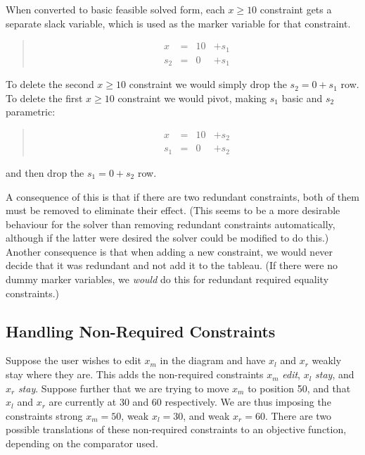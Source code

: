 \documentclass{article}
\newcommand{\strength}{\sf}
\begin{document}
When converted to basic feasible solved form, each $x \geq 10$ constraint
gets a separate slack variable, which is used as the marker variable for
that constraint.


\begin{quote}\vspace*{-1ex}
$$
\begin{array}{rlrrr} 
x & = & 10 & + s_1   \\ \hline
s_2 & = & 0 & + s_1 
\end{array}
$$
\end{quote}\vspace{-0.9ex}

To delete the second $x \geq 10$ constraint we would simply drop
the $s_2 = 0 + s_1$ row.  To delete the first  $x \geq 10$ constraint we
would pivot, making $s_1$ basic and $s_2$ parametric:

\begin{quote}\vspace*{-1ex}
$$
\begin{array}{rlrrr}
x & = & 10 & + s_2   \\ \hline
s_1 & = & 0 & + s_2
\end{array}
$$
\end{quote}\vspace{-0.9ex}

and then drop the  $s_1 = 0 + s_2$ row.

A consequence of this is that if there are two redundant constraints, both
of them must be removed to eliminate their effect.  (This seems to be a
more desirable behaviour for the solver than removing redundant constraints
automatically, although if the latter were desired the solver could be
modified to do this.)  Another consequence is that when adding a new
constraint, we would never decide that it was redundant and not add it to
the tableau.  (If there were no dummy marker variables, we {\em would} do this
for redundant required equality constraints.)

\subsection{Handling Non-Required Constraints}
\label{non-requireds}

Suppose the user wishes to edit $x_m$ in the diagram and have $x_l$ and
$x_r$ weakly stay where they are.  This adds the non-required constraints
$x_m$ {\em edit}, $x_l$ {\em stay}, and $x_r$ {\em stay}.  Suppose further
that we are trying to move $x_m$ to position 50, and that $x_l$ and $x_r$ are
currently at 30 and 60 respectively.  We are thus imposing the constraints
{\strength strong} $x_m = 50$, {\strength weak} $x_l = 30$, and 
{\strength weak} $x_r = 60$.
There are two possible translations of these non-required constraints
to an objective function, depending on the comparator used.
\end{document}
